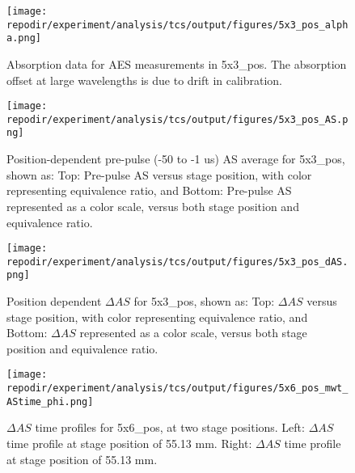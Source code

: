 \begin{figure}[]
\centering
\texttt{[image: \\repodir/experiment/analysis/tcs/output/figures/5x3\_pos\_alpha.png]}
\caption{Absorption data for AES measurements in 5x3\_pos. The absorption offset at large wavelengths is due to drift in calibration.}
\label{fig:SI_5x3_pos_alpha}
\end{figure}%






\begin{figure}[]
\centering
\texttt{[image: \\repodir/experiment/analysis/tcs/output/figures/5x3\_pos\_AS.png]}
\caption{Position-dependent pre-pulse (-50 to -1 us) AS average for 5x3\_pos, shown as: Top: Pre-pulse AS versus stage position, with color representing equivalence ratio, and Bottom: Pre-pulse AS represented as a color scale, versus both stage position and equivalence ratio.}
\label{fig:SI_5x3_pos_AS}
\end{figure}


\begin{figure}[]
    \centering
    \texttt{[image: \\repodir/experiment/analysis/tcs/output/figures/5x3\_pos\_dAS.png]} 
    \caption{Position dependent $\Delta AS$ for 5x3\_pos, shown as: Top: $\Delta AS$ versus stage position, with color representing equivalence ratio, and Bottom: $\Delta AS$ represented as a color scale, versus both stage position and equivalence ratio.}
    \label{fig:SI_5x3_pos_dAS}
\end{figure}


\begin{figure}[]
\centering
\texttt{[image: \\repodir/experiment/analysis/tcs/output/figures/5x6\_pos\_mwt\_AStime\_phi.png]}
\caption{$\Delta AS$ time profiles for 5x6\_pos, at two stage positions. Left: $\Delta AS$ time profile at stage position of 55.13 mm. Right: $\Delta AS$ time profile at stage position of 55.13 mm.}
\label{fig:SI_5x6_pos_mwt_AStime_phi}%
\end{figure}


